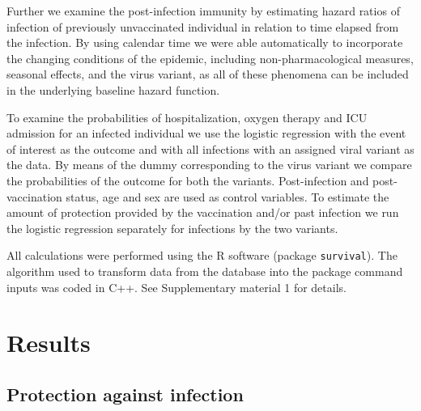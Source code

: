 \documentclass[9pt,twocolumn,twoside,lineno]{pnas-new}
\begin{document}
Further we examine the post-infection immunity by estimating hazard ratios of infection of previously unvaccinated individual in relation to time elapsed from the infection. By using calendar time we were able automatically to incorporate the changing conditions of the epidemic, including non-pharmacological measures, seasonal effects, and the  virus variant, as all of these phenomena can be included in the underlying baseline hazard function. 

To examine the probabilities of hospitalization, oxygen therapy and ICU admission for an infected individual we use the logistic regression with the event of interest as the outcome and with all infections with an assigned viral variant as the data. By means of the dummy corresponding to the virus variant we compare the probabilities of the outcome for both the variants. Post-infection and post-vaccination status, age and sex are used as control variables. To estimate the amount of protection provided by the vaccination and/or past infection we run the logistic regression separately for infections by the two variants. %

 
All calculations were performed using the R software (package \verb|survival|). The algorithm used to transform data from the database into the package command inputs was coded in C++. See Supplementary material 1 for details. 


\section*{Results}
\label{sec3}

\subsection*{Protection against infection}
\end{document}
